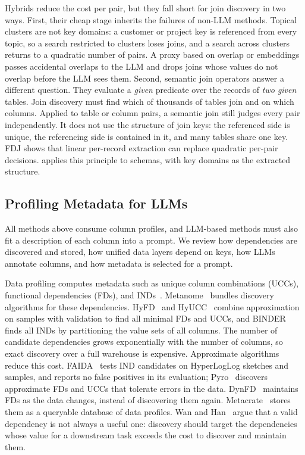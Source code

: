  Hybrids reduce the cost per pair, but they fall short for join discovery in two ways.
First, their cheap stage inherits the failures of non-LLM methods.
Topical clusters are not key domains: a customer or project key is referenced from every topic, so a search restricted to clusters loses joins, and a search across clusters returns to a quadratic number of pairs.
A proxy based on overlap or embeddings passes accidental overlaps to the LLM and drops joins whose values do not overlap before the LLM sees them.
Second, semantic join operators answer a different question.
They evaluate a \emph{given} predicate over the records of \emph{two given} tables.
Join discovery must find which of thousands of tables join and on which columns.
Applied to table or column pairs, a semantic join still judges every pair independently.
It does not use the structure of join keys: the referenced side is unique, the referencing side is contained in it, and many tables share one key.
FDJ shows that linear per-record extraction can replace quadratic per-pair decisions.
\ourmethod applies this principle to schemas, with key domains as the extracted structure.

\subsection{Profiling Metadata for LLMs}
\label{sec:bg_metadata}
All methods above consume column profiles, and LLM-based methods must also fit a description of each column into a prompt.
We review how dependencies are discovered and stored, how unified data layers depend on keys, how LLMs annotate columns, and how metadata is selected for a prompt.

 Data profiling computes metadata such as unique column combinations (UCCs), functional dependencies (FDs), and INDs~\cite{ProfilingSurvey}.
Metanome~\cite{Metanome} bundles discovery algorithms for these dependencies.
HyFD~\cite{HyFD} and HyUCC~\cite{HyUCC} combine approximation on samples with validation to find all minimal FDs and UCCs, and BINDER~\cite{BINDER} finds all INDs by partitioning the value sets of all columns.
The number of candidate dependencies grows exponentially with the number of columns, so exact discovery over a full warehouse is expensive.
Approximate algorithms reduce this cost.
FAIDA~\cite{FAIDA} tests IND candidates on HyperLogLog sketches and samples, and reports no false positives in its evaluation; Pyro~\cite{Pyro} discovers approximate FDs and UCCs that tolerate errors in the data.
DynFD~\cite{DynFD} maintains FDs as the data changes, instead of discovering them again.
Metacrate~\cite{Metacrate} stores them as a queryable database of data profiles.
Wan and Han~\cite{ValueDriven} argue that a valid dependency is not always a useful one: discovery should target the dependencies whose value for a downstream task exceeds the cost to discover and maintain them.

